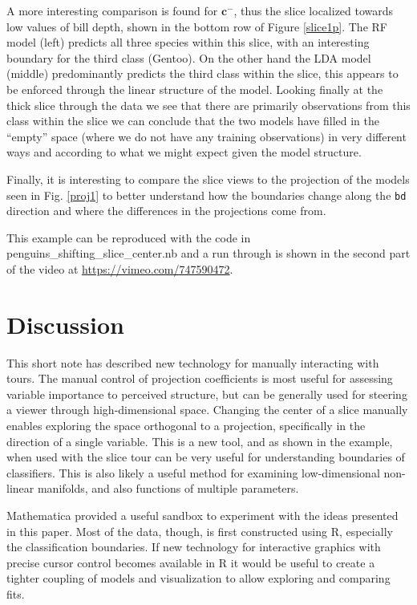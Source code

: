 \documentclass[]{interact}
\theoremstyle{plain}%
\theoremstyle{definition}
\theoremstyle{remark}
\begin{document}
A more interesting comparison is found for \(\mathbf{c}^{-}\), thus the
slice localized towards low values of bill depth, shown in the bottom
row of Figure \ref{slice1p}. The RF model (left) predicts all three
species within this slice, with an interesting boundary for the third
class (Gentoo). On the other hand the LDA model (middle) predominantly
predicts the third class within the slice, this appears to be enforced
through the linear structure of the model. Looking finally at the thick
slice through the data we see that there are primarily observations from
this class within the slice we can conclude that the two models have
filled in the ``empty'' space (where we do not have any training
observations) in very different ways and according to what we might
expect given the model structure.

Finally, it is interesting to compare the slice views to the projection
of the models seen in Fig. \ref{proj1} to better understand how the
boundaries change along the \texttt{bd} direction and where the
differences in the projections come from.

This example can be reproduced with the code in
penguins\_shifting\_slice\_center.nb and a run through is shown in the
second part of the video at \url{https://vimeo.com/747590472}.

\hypertarget{sec:discussion}{%
\section{Discussion}\label{sec:discussion}}

This short note has described new technology for manually interacting
with tours. The manual control of projection coefficients is most useful
for assessing variable importance to perceived structure, but can be
generally used for steering a viewer through high-dimensional space.
Changing the center of a slice manually enables exploring the space
orthogonal to a projection, specifically in the direction of a single
variable. This is a new tool, and as shown in the example, when used
with the slice tour can be very useful for understanding boundaries of
classifiers. This is also likely a useful method for examining
low-dimensional non-linear manifolds, and also functions of multiple
parameters.

Mathematica provided a useful sandbox to experiment with the ideas
presented in this paper. Most of the data, though, is first constructed
using R, especially the classification boundaries. If new technology for
interactive graphics with precise cursor control becomes available in R
it would be useful to create a tighter coupling of models and
visualization to allow exploring and comparing fits.
\end{document}
